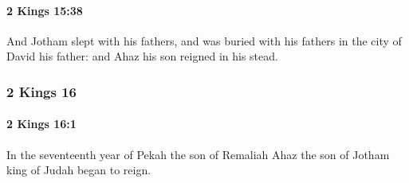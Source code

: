 		\paragraph{2 Kings 15:38} %
			\label{2KINGS-15-38}

			And Jotham slept with his fathers, and was buried with his fathers in the city of David his father: and Ahaz his son reigned in his stead.

	\subsubsection{2 Kings 16} %
		\label{2KINGS-16}

		\paragraph{2 Kings 16:1} %
			\label{2KINGS-16-1}

			In the seventeenth year of Pekah the son of Remaliah Ahaz the son of Jotham king of Judah began to reign.

